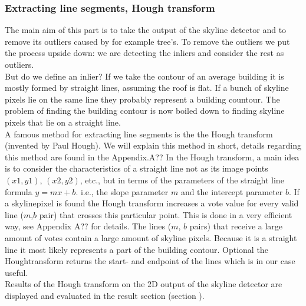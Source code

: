 \subsubsection{Extracting line segments, Hough transform} %

	The main aim of this part is to take the output of the skyline detector and to remove its outliers caused by for example tree's. To remove the outliers we put the process upside down: we are detecting the inliers and consider the rest as outliers.\\
	But do we define an inlier? If we take the contour of an average building it is mostly formed by straight lines, assuming the roof is flat.
	If a bunch of skyline pixels lie on the same line they probably represent a building countour.
	The problem of finding the building contour is now boiled down to finding skyline pixels that lie on a straight line.
	\\
	A famous method for extracting line segments is the the Hough transform (invented by Paul Hough).
	We will explain this method in short, details regarding this method are found in the Appendix.A??%
	In the Hough transform, a main idea is to consider the characteristics of a straight line not as its image points $(x1, y1)$, $(x2, y2)$, etc., but in terms of the parameters of the straight line formula $y = mx + b$. i.e., the slope parameter $m$ and the intercept parameter $b$.
	If a skylinepixel is found the Hough transform increases a vote value for every valid line ($m$,$b$ pair) that crosses this particular point. This is done in a very efficient way, see Appendix A?? %
	for details.
	The lines ($m$, $b$ pairs) that receive a large amount of votes contain a large amount of skyline pixels. Because it is a straight line it most likely represents a part of the building contour. 
	Optional the Houghtransform returns the start- and endpoint of the lines which is in our case useful. 
	\\
	Results of the Hough transform on the 2D output of the skyline detector are displayed and evaluated in the result section (section %
	).

